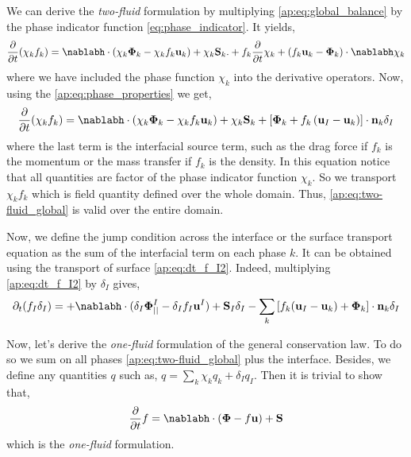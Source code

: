 We can derive the \textit{two-fluid} formulation by multiplying \ref{ap:eq:global_balance} by the phase indicator function \ref{eq:phase_indicator}. 
It yields, 
\begin{equation*}
    \frac{\partial}{\partial t} (\chi_k f_k)
    = \nablabh \cdot (\chi_k \bm{\Phi}_k - \chi_k f_k \textbf{u}_k)
    + \chi_k \textbf{S}_k.
    + f_k \frac{\partial}{\partial t} \chi_k
    + \left(
        f_k \textbf{u}_k 
        - \bm{\Phi}_k
    \right) \cdot \nablabh \chi_k
\end{equation*}
where we have included the phase function $\chi_k$ into the derivative operators. 
Now, using the \ref{ap:eq:phase_properties} we get, 
\begin{equation}
    \frac{\partial}{\partial t} (\chi_k f_k)
    = \nablabh \cdot (\chi_k \bm{\Phi}_k - \chi_k f_k \textbf{u}_k)
    + \chi_k \textbf{S}_k
    + \left[
        \bm{\Phi}_k 
        + f_k 
        \left(
            \textbf{u}_I
            - \textbf{u}_k
        \right) 
    \right]
    \cdot \textbf{n}_k \delta_I 
    \label{ap:eq:two-fluid_global}
\end{equation}
where the last term is the interfacial source term, such as the drag force if $f_k$ is the momentum or the mass transfer if $f_k$ is the density. 
In this equation notice that all quantities are factor of the phase indicator function $\chi_k$. 
So we transport $\chi_k f_k$ which is field quantity defined over the whole domain. 
Thus, \ref{ap:eq:two-fluid_global} is valid over the entire domain.   

Now, we define the jump condition across the interface or the surface transport equation as the sum of the interfacial term on each phase $k$. 
It can be obtained using  the transport of surface \ref{ap:eq:dt_f_I2}.
Indeed, multiplying \ref{ap:eq:dt_f_I2} by $\delta_I$ gives, 
\begin{equation}
    \pddt (f_I\delta_I)  
    = 
    + \nablabh \cdot (\delta_I \mathbf{\Phi}^I_{||} - \delta_I f_I \textbf{u}^I)
    +\textbf{S}_I \delta_I
    - \sum_k \left[
    f_k (\textbf{u}_I - \textbf{u}_k)
    + \mathbf{\Phi}_k
    \right] \cdot \textbf{n}_k \delta_I
    \label{ap:eq:general_jump}
\end{equation}

Now, let's derive the \textit{one-fluid} formulation of the general conservation law.
To do so we sum on all phases \ref{ap:eq:two-fluid_global} plus the interface. 
Besides, we define any quantities $q$ such as, $q = \sum_k \chi_k q_k + \delta_I q_I$.
Then it is trivial to show that, 
\begin{equation}
    \frac{\partial}{\partial t} f
    = \nablabh \cdot (\bm{\Phi} - f \textbf{u})
    + \textbf{S}
    \label{ap:eq:one-fluid_global}
\end{equation}
which is the \textit{one-fluid} formulation. 

